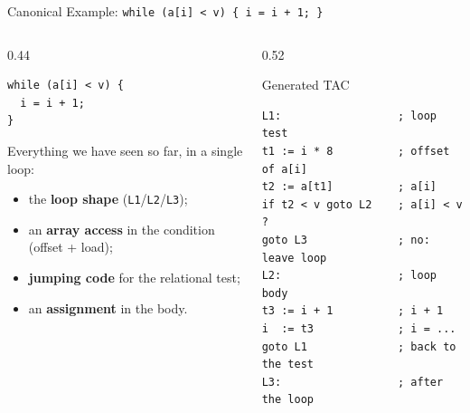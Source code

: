 \documentclass[aspectratio=169]{beamer}
\newcommand{\tc}[1]{\texttt{#1}}
\begin{document}
\begin{frame}[fragile]{Canonical Example: \tc{while (a[i] < v) \{ i = i + 1; \}}}
  \begin{columns}[T]
    \begin{column}{0.44\textwidth}
      \begin{verbatim}
while (a[i] < v) {
  i = i + 1;
}
      \end{verbatim}
      \small Everything we have seen so far, in a single loop:
      \begin{itemize}
        \item the \textbf{loop shape} (\tc{L1}/\tc{L2}/\tc{L3});
        \item an \textbf{array access} in the condition (offset + load);
        \item \textbf{jumping code} for the relational test;
        \item an \textbf{assignment} in the body.
      \end{itemize}
    \end{column}
    \begin{column}{0.52\textwidth}
      \begin{block}{Generated TAC}
        \begin{verbatim}
L1:                  ; loop test
t1 := i * 8          ; offset of a[i]
t2 := a[t1]          ; a[i]
if t2 < v goto L2    ; a[i] < v ?
goto L3              ; no: leave loop
L2:                  ; loop body
t3 := i + 1          ; i + 1
i  := t3             ; i = ...
goto L1              ; back to the test
L3:                  ; after the loop
        \end{verbatim}
      \end{block}
    \end{column}
  \end{columns}
\end{frame}
\end{document}

